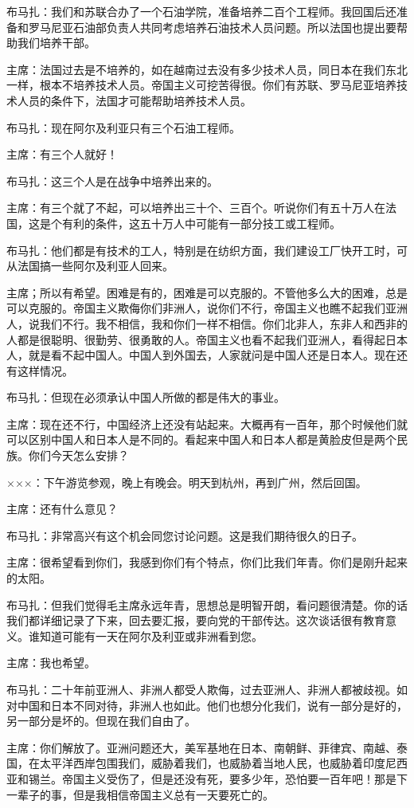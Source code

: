 布马扎：我们和苏联合办了一个石油学院，准备培养二百个工程师。我回国后还准备和罗马尼亚石油部负责人共同考虑培养石油技术人员问题。所以法国也提出要帮助我们培养干部。

主席：法国过去是不培养的，如在越南过去没有多少技术人员，同日本在我们东北一样，根本不培养技术人员。帝国主义可挖苦得很。你们有苏联、罗马尼亚培养技术人员的条件下，法国才可能帮助培养技术人员。

布马扎：现在阿尔及利亚只有三个石油工程师。

主席：有三个人就好！

布马扎：这三个人是在战争中培养出来的。

主席：有三个就了不起，可以培养出三十个、三百个。听说你们有五十万人在法国，这是个有利的条件，这五十万人中可能有一部分技工或工程师。

布马扎：他们都是有技术的工人，特别是在纺织方面，我们建设工厂快开工时，可从法国搞一些阿尔及利亚人回来。

主席；所以有希望。困难是有的，困难是可以克服的。不管他多么大的困难，总是可以克服的。帝国主义欺侮你们非洲人，说你们不行，帝国主义也瞧不起我们亚洲人，说我们不行。我不相信，我和你们一样不相信。你们北非人，东非人和西非的人都是很聪明、很勤劳、很勇敢的人。帝国主义也看不起我们亚洲人，看得起日本人，就是看不起中国人。中国人到外国去，人家就问是中国人还是日本人。现在还有这样情况。

布马扎：但现在必须承认中国人所做的都是伟大的事业。

主席：现在还不行，中国经济上还没有站起来。大概再有一百年，那个时候他们就可以区别中国人和日本人是不同的。看起来中国人和日本人都是黄脸皮但是两个民族。你们今天怎么安排？

×××：下午游览参观，晚上有晚会。明天到杭州，再到广州，然后回国。

主席：还有什么意见？

布马扎：非常高兴有这个机会同您讨论问题。这是我们期待很久的日子。

主席：很希望看到你们，我感到你们有个特点，你们比我们年青。你们是刚升起来的太阳。

布马扎：但我们觉得毛主席永远年青，思想总是明智开朗，看问题很清楚。你的话我们都详细记录了下来，回去要汇报，要向党的干部传达。这次谈话很有教育意义。谁知道可能有一天在阿尔及利亚或非洲看到您。

主席：我也希望。

布马扎：二十年前亚洲人、非洲人都受人欺侮，过去亚洲人、非洲人都被歧视。如对中国和日本不同对待，非洲人也如此。他们也想分化我们，说有一部分是好的，另一部分是坏的。但现在我们自由了。

主席：你们解放了。亚洲问题还大，美军基地在日本、南朝鲜、菲律宾、南越、泰国，在太平洋西岸包围我们，威胁着我们，也威胁着当地人民，也威胁着印度尼西亚和锡兰。帝国主义受伤了，但是还没有死，要多少年，恐怕要一百年吧！那是下一辈子的事，但是我相信帝国主义总有一天要死亡的。


